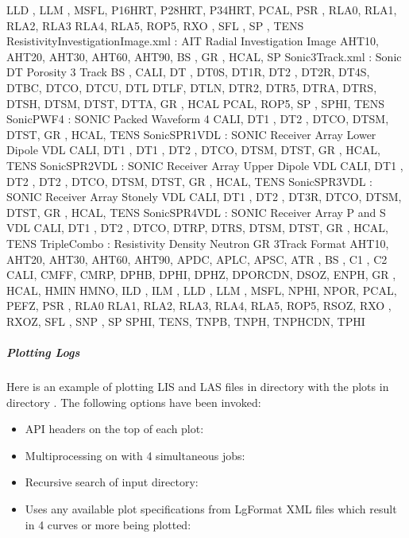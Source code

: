 \documentclass[letterpaper,10pt,english]{sphinxmanual}
\begin{document}
\begin{sphinxVerbatim}[commandchars=\\\{\}]
    LLD , LLM , MSFL, P16H\PYGZus{}RT, P28H\PYGZus{}RT, P34H\PYGZus{}RT, PCAL, PSR , RLA0, RLA1, RLA2, RLA3
    RLA4, RLA5, ROP5, RXO , SFL , SP  , TENS
Resistivity\PYGZus{}Investigation\PYGZus{}Image.xml : AIT Radial Investigation Image
    AHT10, AHT20, AHT30, AHT60, AHT90, BS  , GR  , HCAL, SP
Sonic\PYGZus{}3Track.xml                    : Sonic DT Porosity 3 Track
    BS  , CALI, DT  , DT0S, DT1R, DT2 , DT2R, DT4S, DTBC, DTCO, DTCU, DTL
    DTLF, DTLN, DTR2, DTR5, DTRA, DTRS, DTSH, DTSM, DTST, DTTA, GR  , HCAL
    PCAL, ROP5, SP  , SPHI, TENS
Sonic\PYGZus{}PWF4                          : SONIC Packed Waveform 4
    CALI, DT1 , DT2 , DTCO, DTSM, DTST, GR  , HCAL, TENS
Sonic\PYGZus{}SPR1\PYGZus{}VDL                      : SONIC Receiver Array Lower Dipole VDL
    CALI, DT1 , DT1 , DT2 , DTCO, DTSM, DTST, GR  , HCAL, TENS
Sonic\PYGZus{}SPR2\PYGZus{}VDL                      : SONIC Receiver Array Upper Dipole VDL
    CALI, DT1 , DT2 , DT2 , DTCO, DTSM, DTST, GR  , HCAL, TENS
Sonic\PYGZus{}SPR3\PYGZus{}VDL                      : SONIC Receiver Array Stonely VDL
    CALI, DT1 , DT2 , DT3R, DTCO, DTSM, DTST, GR  , HCAL, TENS
Sonic\PYGZus{}SPR4\PYGZus{}VDL                      : SONIC Receiver Array P and S VDL
    CALI, DT1 , DT2 , DTCO, DTRP, DTRS, DTSM, DTST, GR  , HCAL, TENS
Triple\PYGZus{}Combo                        : Resistivity Density Neutron GR 3Track Format
    AHT10, AHT20, AHT30, AHT60, AHT90, APDC, APLC, APSC, ATR , BS  , C1  , C2
    CALI, CMFF, CMRP, DPHB, DPHI, DPHZ, DPOR\PYGZus{}CDN, DSOZ, ENPH, GR  , HCAL, HMIN
    HMNO, ILD , ILM , LLD , LLM , MSFL, NPHI, NPOR, PCAL, PEFZ, PSR , RLA0
    RLA1, RLA2, RLA3, RLA4, RLA5, ROP5, RSOZ, RXO , RXOZ, SFL , SNP , SP
    SPHI, TENS, TNPB, TNPH, TNPH\PYGZus{}CDN, TPHI
\end{sphinxVerbatim}


\subparagraph{Plotting Logs}
\label{\detokenize{cmd_line_tools/TD_cmd_line_tools:plotting-logs}}
Here is an example of plotting LIS and LAS files in directory  with the plots in directory . The following options have been invoked:
\begin{itemize}
\item {} 
API headers on the top of each plot: 

\item {} 
Multiprocessing on with 4 simultaneous jobs: 

\item {} 
Recursive search of input directory: 

\item {} 
Uses any available plot specifications from LgFormat XML files which result in 4 curves or more being plotted: 

\end{itemize}
\end{document}

